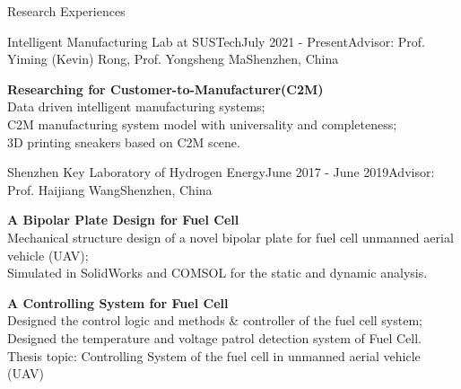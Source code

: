 \documentclass{resume} %
\begin{document}

\begin{rSection}{Research Experiences}

    \begin{rSubsection}{Intelligent Manufacturing Lab at SUSTech}{July 2021 - Present}{Advisor: Prof. Yiming (Kevin) Rong, Prof. Yongsheng Ma}{Shenzhen, China}
    \vspace{-4pt}
    \item \textbf{Researching for Customer-to-Manufacturer(C2M) } \\
    Data driven intelligent manufacturing systems;\\
    C2M manufacturing system model with universality and completeness;\\
    3D printing sneakers based on C2M scene.
    \end{rSubsection}
    
    
    \begin{rSubsection}{Shenzhen Key Laboratory of Hydrogen Energy}{June 2017 - June 2019}{Advisor: Prof. Haijiang Wang}{Shenzhen, China}
    \vspace{-4pt}
    \item \textbf{A Bipolar Plate Design for Fuel Cell} \\
    Mechanical structure design of a novel bipolar plate for fuel cell unmanned aerial vehicle (UAV);\\
    Simulated in SolidWorks and COMSOL for the static and dynamic analysis.

    \item \textbf{A Controlling System for Fuel Cell}\\ 
    Designed the control logic and methods \& controller of the fuel cell system; \\
    Designed the temperature and voltage patrol detection system of Fuel Cell.\\
    Thesis topic: Controlling System of the fuel cell in unmanned aerial vehicle (UAV)


\end{rSubsection}
\end{rSection}
\end{document}
